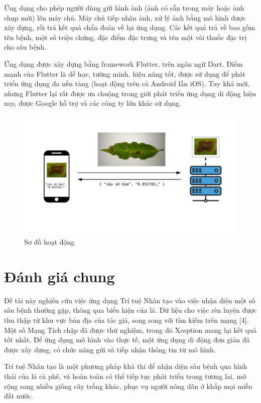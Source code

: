 \documentclass[a4paper,14pt]{extarticle}
\begin{document}
	Ứng dụng cho phép người dùng gửi hình ảnh (ảnh có sẵn trong máy hoặc ảnh chụp mới) lên máy chủ. Máy chủ tiếp nhận ảnh, xử lý ảnh bằng mô hình được xây dựng, rồi trả kết quả chẩn đoán về lại ứng dụng. Các kết quả trả về bao gồm tên bệnh, một số triệu chứng, đặc điểm đặc trưng và tên một vài thuốc đặc trị cho sâu bệnh.

	Ứng dụng được xây dựng bằng framework Flutter, trên ngôn ngữ Dart. Điểm mạnh của Flutter là dễ học, tường minh, hiệu năng tốt, được sử dụng để phát triển ứng dụng đa nền tảng (hoạt động trên cả Android lẫn iOS). Tuy khá mới, nhưng Flutter lại rất được ưa chuộng trong giới phát triển ứng dụng di động hiện nay, được Google hỗ trợ và các công ty lớn khác sử dụng.

	\begin{figure}[H]
		\centering
		\includegraphics[scale=0.4]{images/chart.pdf}
		\caption{Sơ đồ hoạt động}
	\end{figure}

		
\section{Đánh giá chung}
	Đề tài này nghiên cứu việc ứng dụng Trí tuệ Nhân tạo vào việc nhận diện một số sâu bệnh thường gặp, thông qua biểu hiện của lá. Dữ liệu cho việc rèn luyện được thu thập từ khu vực bản địa của tác giả, song song với tìm kiếm trên mạng [4]. Một số Mạng Tích chập đã được thử nghiệm, trong đó Xception mang lại kết quả tốt nhất. Để ứng dụng mô hình vào thực tế, một ứng dụng di động đơn giản đã được xây dựng, có chức năng gửi và tiếp nhận thông tin từ mô hình.
	
	Trí tuệ Nhân tạo là một phương pháp khả thi để nhận diện sâu bệnh qua hình thái của lá cà phê, và hoàn toàn có thể tiếp tục phát triển trong tương lai, mở rộng sang nhiều giống cây trồng khác, phục vụ người nông dân ở khắp mọi miền đất nước.
\end{document}
